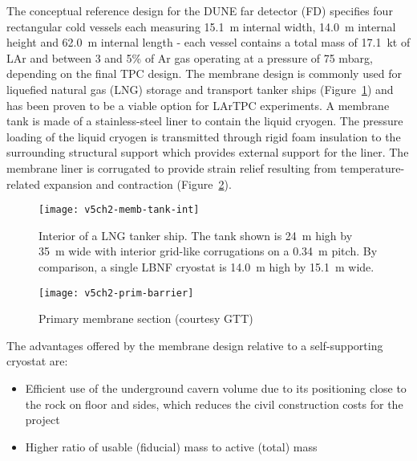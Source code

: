 
The conceptual reference design for the DUNE far detector (FD) %
 specifies four   %
rectangular cold vessels each measuring 15.1~m internal width, 14.0~m internal 
height and 62.0~m internal length - each vessel contains a total mass of 
17.1~kt of LAr and between 3 and 5\% of Ar gas operating at a 
pressure of 75 mbarg, depending on the final TPC design. The 
membrane design is commonly 
used for liquefied natural gas (LNG) storage and transport 
tanker ships (Figure~\ref{fig:memb-tank-int}) and has been 
proven to be a viable option for LArTPC experiments. 
A membrane tank 
is made of a stainless-steel liner to contain the liquid cryogen. 
The pressure loading of the liquid cryogen is transmitted 
through rigid foam insulation to the surrounding structural support 
which provides external support for the liner. The membrane 
liner is corrugated to provide strain relief resulting from 
temperature-related expansion and contraction (Figure~\ref{fig:prim-barrier}).

\begin{figure}[htbp]
\centering
\texttt{[image: v5ch2-memb-tank-int]}
\caption[Interior of a LNG tanker ship]{Interior of a LNG tanker ship. 
The tank shown is 24~m high by 35~m wide with interior grid-like 
corrugations on a 0.34~m pitch. By comparison, a single LBNF 
cryostat is %
14.0~m high by 15.1~m wide.}
\label{fig:memb-tank-int}
\end{figure}

\begin{figure}[htbp]
\centering
\texttt{[image: v5ch2-prim-barrier]}
\caption[Primary membrane section]{Primary membrane section (courtesy GTT)}
\label{fig:prim-barrier}
\end{figure}

The advantages offered by the membrane design relative to a self-supporting cryostat are:
\begin{itemize}
\item Efficient use of the underground cavern volume due to its positioning 
close to the rock on floor and sides, which reduces the civil construction 
costs for the project
\item Higher ratio of usable (fiducial) mass to active (total) mass
\end{itemize}

